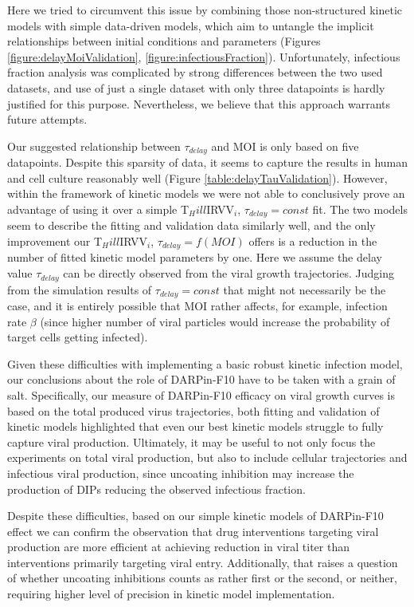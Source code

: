 Here we tried to circumvent this issue by combining those non-structured kinetic models with simple data-driven models, which aim to untangle the implicit relationships between initial conditions and parameters (Figures \ref{figure:delayMoiValidation}, \ref{figure:infectiousFraction}). Unfortunately, infectious fraction analysis was complicated by strong differences between the two used datasets, and use of just a single dataset with only three datapoints is hardly justified for this purpose. Nevertheless, we believe that this approach warrants future attempts.

Our suggested relationship between $\tau_{delay}$ and MOI is  only based on five datapoints. Despite this sparsity of data, it seems to capture the results in human and cell culture reasonably well (Figure \ref{table:delayTauValidation}). However, within the framework of kinetic models we were not able to conclusively prove an advantage of using it over a simple T$_Hill$IRVV$_i$, $\tau_{delay} = const$ fit. The two models seem to describe the fitting and validation data similarly well, and the only improvement our T$_Hill$IRVV$_i$, $\tau_{delay} = f(MOI)$ offers is a reduction in the number of fitted kinetic model parameters by one. Here we assume the delay value $\tau_{delay}$ can be directly observed from the viral growth trajectories. Judging from the simulation results of $\tau_{delay} = const$ that might not necessarily be the case, and it is entirely possible that MOI rather affects, for example, infection rate $\beta$ (since higher number of viral particles would increase the probability of target cells getting infected). 

Given these difficulties with implementing a basic robust kinetic infection model, our conclusions about the role of DARPin-F10 have to be taken with a grain of salt. Specifically, our measure of DARPin-F10 efficacy on viral growth curves is based on the total produced virus trajectories, both fitting and validation of kinetic models highlighted that even our best kinetic models struggle to fully capture viral production. Ultimately, it may be useful to not only focus the experiments on total viral production, but also to include cellular trajectories and infectious viral production, since uncoating inhibition may increase the production of DIPs reducing the observed infectious fraction.

Despite these difficulties, based on our simple kinetic models of DARPin-F10 effect we can confirm the observation \cite{heldt2013multiscale} that drug interventions targeting viral production are more efficient at achieving reduction in viral titer than interventions primarily targeting viral entry. Additionally, that raises a question of whether uncoating inhibitions counts as rather first or the second, or neither, requiring higher level of precision in kinetic model implementation.